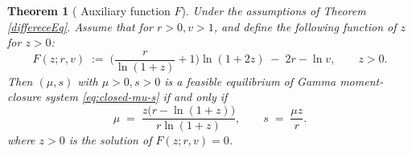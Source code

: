 \documentclass[12pt]{article}
\newtheorem{theorem}{Theorem}[section]
\theoremstyle{definition}
\begin{document}
\begin{theorem}[ Auxiliary function $F$]\label{auxi} Under the assumptions of Theorem \ref{differeceEq}. Assume that for $r>0, v>1$, and  define the following function of $z$ for \(z>0\): 
\begin{equation}\label{F1}
F(z;r,v)\;:=\;\Big(\frac{r}{\ln(1+z)}+1\Big)\ln(1+2z)\;-\;2r-\ln v,
\qquad z>0. 
\end{equation}
Then \((\mu,s)\) with $\mu>0,s>0$ is a feasible equilibrium  of Gamma moment-closure system \eqref{eq:closed-mu-s} if and only if
\begin{equation}\label{F2}
\mu \;=\; \frac{z\big(r-\ln(1+z)\big)}{r\ln(1+z)},
\qquad
s \;=\; \frac{\mu z}{r}.
\end{equation}
where $z>0$ is the solution of $F(z;r,v)=0$.
\end{theorem}
\end{document}
